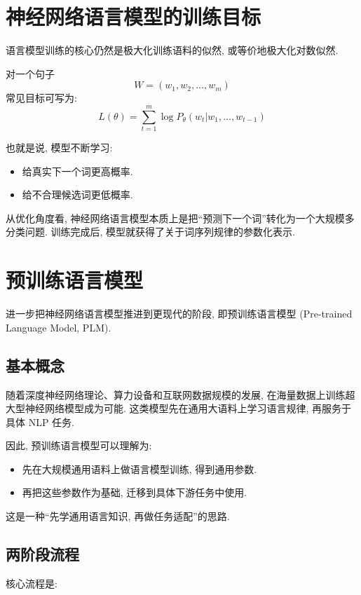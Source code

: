 \section{神经网络语言模型的训练目标}


语言模型训练的核心仍然是极大化训练语料的似然,
或等价地极大化对数似然.

对一个句子
\[
W = (w_1, w_2, \dots, w_m)
\]
常见目标可写为:
\[
L(\theta)
  = \sum_{t=1}^m \log P_{\theta} (w_t | w_1, \dots, w_{t-1})
\]

也就是说, 模型不断学习:

\begin{itemize}
\item 给真实下一个词更高概率.
\item 给不合理候选词更低概率.
\end{itemize}

从优化角度看, 神经网络语言模型本质上是把“预测下一个词”转化为一个大规模多分类问题.
训练完成后, 模型就获得了关于词序列规律的参数化表示.

\section{预训练语言模型}


进一步把神经网络语言模型推进到更现代的阶段, 即预训练语言模型
(Pre-trained Language Model, PLM).

\subsection{基本概念}


随着深度神经网络理论、算力设备和互联网数据规模的发展,
在海量数据上训练超大型神经网络模型成为可能.
这类模型先在通用大语料上学习语言规律, 再服务于具体 NLP 任务.

因此, 预训练语言模型可以理解为:

\begin{itemize}
\item 先在大规模通用语料上做语言模型训练, 得到通用参数.
\item 再把这些参数作为基础, 迁移到具体下游任务中使用.
\end{itemize}

这是一种“先学通用语言知识, 再做任务适配”的思路.

\subsection{两阶段流程}


核心流程是:

